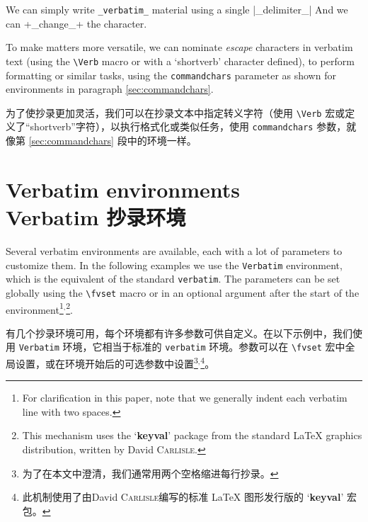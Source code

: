\documentclass[twoside]{article}
\newcommand\cs[1]{\texttt{\textbackslash#1}}
\begin{document}

\begin{SideBySideExample}
  \DefineShortVerb{\|}
  We can simply write \Verb+_verbatim_+
  material using a single |_delimiter_|
  \UndefineShortVerb{\|}
  \DefineShortVerb{\+}
  And we can +_change_+ the character.
\end{SideBySideExample}

To make matters more versatile, we can nominate \emph{escape} characters
in verbatim text (using the \cs{Verb} macro or with a `shortverb' character
defined), to perform formatting or similar tasks, using the
\texttt{commandchars} parameter as shown for environments in paragraph
\ref{sec:commandchars}.

为了使抄录更加灵活，我们可以在抄录文本中指定转义字符（使用 \cs{Verb} 宏或定义了“shortverb”字符），以执行格式化或类似任务，使用 \texttt{commandchars} 参数，就像第 \ref{sec:commandchars} 段中的环境一样。

\section{Verbatim environments\\Verbatim 抄录环境}

Several verbatim environments are available, each with a lot of
parameters to customize them. In the following examples we use the
\texttt{Verbatim} environment, which is the equivalent of the standard
\texttt{verbatim}. The parameters can be set globally using the \cs{fvset}
macro or in an optional argument after the start of the
environment\footnote{For clarification in this paper, note that we
generally indent each verbatim line with two
spaces.}$^,$\footnote{This mechanism uses the
`\textbf{keyval}' package from the standard \LaTeX{} graphics
distribution, written by David \textsc{Carlisle}.}.

有几个抄录环境可用，每个环境都有许多参数可供自定义。在以下示例中，我们使用 \texttt{Verbatim} 环境，它相当于标准的 \texttt{verbatim} 环境。参数可以在 \cs{fvset} 宏中全局设置，或在环境开始后的可选参数中设置\footnote{为了在本文中澄清，我们通常用两个空格缩进每行抄录。}$^,$\footnote{此机制使用了由David \textsc{Carlisle}编写的标准 \LaTeX{} 图形发行版的 `\textbf{keyval}' 宏包。}。
\end{document}

